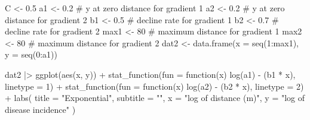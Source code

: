 \documentclass[
  letterpaper,
  DIV=11,
  numbers=noendperiod]{scrreprt}
\newenvironment{Shaded}{\begin{snugshade}}{\end{snugshade}}
\newcommand{\AttributeTok}[1]{\textcolor[rgb]{0.40,0.45,0.13}{#1}}
\newcommand{\CommentTok}[1]{\textcolor[rgb]{0.37,0.37,0.37}{#1}}
\newcommand{\ControlFlowTok}[1]{\textcolor[rgb]{0.00,0.23,0.31}{#1}}
\newcommand{\DecValTok}[1]{\textcolor[rgb]{0.68,0.00,0.00}{#1}}
\newcommand{\FloatTok}[1]{\textcolor[rgb]{0.68,0.00,0.00}{#1}}
\newcommand{\FunctionTok}[1]{\textcolor[rgb]{0.28,0.35,0.67}{#1}}
\newcommand{\NormalTok}[1]{\textcolor[rgb]{0.00,0.23,0.31}{#1}}
\newcommand{\OtherTok}[1]{\textcolor[rgb]{0.00,0.23,0.31}{#1}}
\newcommand{\SpecialCharTok}[1]{\textcolor[rgb]{0.37,0.37,0.37}{#1}}
\newcommand{\StringTok}[1]{\textcolor[rgb]{0.13,0.47,0.30}{#1}}
\begin{document}
\begin{Shaded}
\begin{Highlighting}[]
\NormalTok{C }\OtherTok{\textless{}{-}} \FloatTok{0.5}
\NormalTok{a1 }\OtherTok{\textless{}{-}} \FloatTok{0.2} \CommentTok{\# y at zero distance for gradient 1}
\NormalTok{a2 }\OtherTok{\textless{}{-}} \FloatTok{0.2} \CommentTok{\# y at zero distance for gradient 2}
\NormalTok{b1 }\OtherTok{\textless{}{-}} \FloatTok{0.5} \CommentTok{\# decline rate for gradient 1}
\NormalTok{b2 }\OtherTok{\textless{}{-}} \FloatTok{0.7} \CommentTok{\# decline rate for gradient 2}
\NormalTok{max1 }\OtherTok{\textless{}{-}} \DecValTok{80} \CommentTok{\# maximum distance for gradient 1}
\NormalTok{max2 }\OtherTok{\textless{}{-}} \DecValTok{80} \CommentTok{\# maximum distance for gradient 2}
\NormalTok{dat2 }\OtherTok{\textless{}{-}} \FunctionTok{data.frame}\NormalTok{(}\AttributeTok{x =} \FunctionTok{seq}\NormalTok{(}\DecValTok{1}\SpecialCharTok{:}\NormalTok{max1), }\AttributeTok{y =} \FunctionTok{seq}\NormalTok{(}\DecValTok{0}\SpecialCharTok{:}\NormalTok{a1))}

\NormalTok{dat2 }\SpecialCharTok{|\textgreater{}}
  \FunctionTok{ggplot}\NormalTok{(}\FunctionTok{aes}\NormalTok{(x, y)) }\SpecialCharTok{+}
  \FunctionTok{stat\_function}\NormalTok{(}\AttributeTok{fun =} \ControlFlowTok{function}\NormalTok{(x) }\FunctionTok{log}\NormalTok{(a1) }\SpecialCharTok{{-}}\NormalTok{ (b1 }\SpecialCharTok{*}\NormalTok{ x), }\AttributeTok{linetype =} \DecValTok{1}\NormalTok{) }\SpecialCharTok{+}
  \FunctionTok{stat\_function}\NormalTok{(}\AttributeTok{fun =} \ControlFlowTok{function}\NormalTok{(x) }\FunctionTok{log}\NormalTok{(a2) }\SpecialCharTok{{-}}\NormalTok{ (b2 }\SpecialCharTok{*}\NormalTok{ x), }\AttributeTok{linetype =} \DecValTok{2}\NormalTok{) }\SpecialCharTok{+}
  \FunctionTok{labs}\NormalTok{(}
    \AttributeTok{title =} \StringTok{"Exponential"}\NormalTok{,}
    \AttributeTok{subtitle =} \StringTok{""}\NormalTok{,}
    \AttributeTok{x =} \StringTok{"log of distance (m)"}\NormalTok{,}
    \AttributeTok{y =} \StringTok{"log of disease incidence"}
\NormalTok{  )}
\end{Highlighting}
\end{Shaded}
\end{document}
